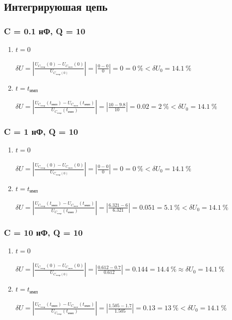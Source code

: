 \subsection{Интегрируюшая цепь}

\subsubsection{C = 0.1 нФ, Q = 10}

\begin{enumerate}
\item $t = 0$

	$\delta U = \left| \frac{U_{C_\text{теор}}(0) - U_{C_\text{эксп}}(0)}{U_{C_\text{теор}(0)}} \right| = \left| \frac{0 - 0}{0} \right| = 0 = 0~\% < \delta U_0 = 14.1~\%$

\item $t = t_\text{имп}$

	$\delta U = \left| \frac{U_{C_\text{теор}}(t_\text{имп}) - U_{C_\text{эксп}}(t_\text{имп})}{U_{C_\text{теор}}(t_\text{имп})} \right| = \left| \frac{10 - 9.8}{10} \right| = 0.02 = 2~\% < \delta U_0 = 14.1~\%$
\end{enumerate}

\subsubsection{C = 1 нФ, Q = 10}

\begin{enumerate}
\item $t = 0$

	$\delta U = \left| \frac{U_{C_\text{теор}}(0) - U_{C_\text{эксп}}(0)}{U_{C_\text{теор}(0)}} \right| = \left| \frac{0 - 0}{0} \right| = 0 = 0~\% < \delta U_0 = 14.1~\%$

\item $t = t_\text{имп}$

	$\delta U = \left| \frac{U_{C_\text{теор}}(t_\text{имп}) - U_{C_\text{эксп}}(t_\text{имп})}{U_{C_\text{теор}}(t_\text{имп})} \right| = \left| \frac{6.321 - 6}{6.321} \right| = 0.051 = 5.1~\% < \delta U_0 = 14.1~\%$
\end{enumerate}

\subsubsection{C = 10 нФ, Q = 10}

\begin{enumerate}
\item $t = 0$

	$\delta U = \left| \frac{U_{C_\text{теор}}(0) - U_{C_\text{эксп}}(0)}{U_{C_\text{теор}(0)}} \right| = \left| \frac{0.612 - 0.7}{0.612} \right| = 0.144 = 14.4~\% \approx \delta U_0 = 14.1~\%$

\item $t = t_\text{имп}$

	$\delta U = \left| \frac{U_{C_\text{теор}}(t_\text{имп}) - U_{C_\text{эксп}}(t_\text{имп})}{U_{C_\text{теор}}(t_\text{имп})} \right| = \left| \frac{1.505 - 1.7}{1.505} \right| = 0.13 = 13~\% < \delta U_0 = 14.1~\%$
\end{enumerate}

